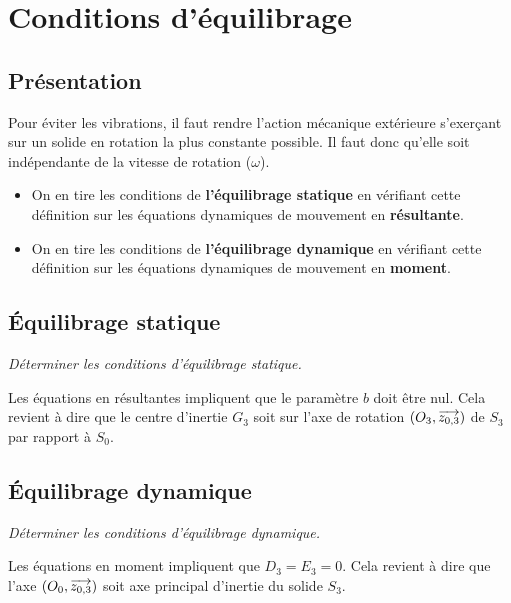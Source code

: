 \documentclass[10pt,fleqn]{article} %
\begin{document}
\section{Conditions d'équilibrage}

\subsection{Présentation}

\begin{definition}
Pour éviter les vibrations, il faut rendre l'action mécanique extérieure s'exerçant sur un solide en rotation la plus constante possible. Il faut donc qu'elle soit indépendante de la vitesse de rotation ($\omega$).
\begin{itemize}
\item On en tire les conditions de \textbf{l'équilibrage statique} en vérifiant cette définition sur les équations dynamiques de mouvement en \textbf{résultante}.
\item On en tire les conditions de \textbf{l'équilibrage dynamique} en vérifiant cette définition sur les équations dynamiques de mouvement en \textbf{moment}.
\end{itemize}
 
\end{definition}

\subsection{Équilibrage statique}

\begin{exemple}

\textit{Déterminer les conditions d'équilibrage statique.}

Les équations en résultantes impliquent que le paramètre $b$ doit être nul. Cela revient à dire que le centre d'inertie $G_3$ soit sur l'axe de rotation $\left(O_3,\overrightarrow{z_{0,3}}\right)$ de $S_3$ par rapport à $S_0$.
\end{exemple}


\subsection{Équilibrage dynamique}

\begin{exemple}
\textit{Déterminer les conditions d'équilibrage dynamique.}

Les équations en moment impliquent que $D_3=E_3=0$.
Cela revient à dire que l'axe $\left(O_0,\overrightarrow{{z_{0,3}}}\right)$ soit axe principal d'inertie du solide $S_3$.
\end{exemple}
\end{document}
